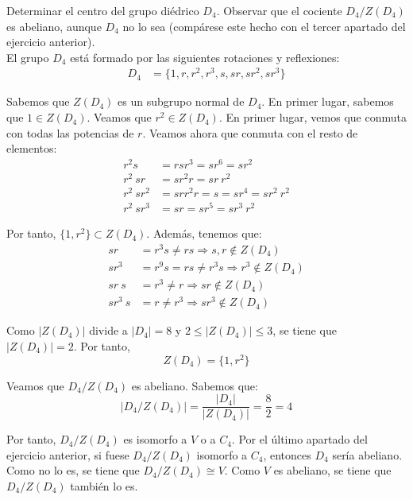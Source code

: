\begin{ejercicio}\label{ej:4.5}
    Determinar el centro del grupo diédrico $D_4$. Observar que el cociente $D_4/Z(D_4)$ es abeliano, aunque $D_4$ no lo sea (compárese este hecho con el tercer apartado del ejercicio anterior).\\

    El grupo $D_4$ está formado por las siguientes rotaciones y reflexiones:
    \begin{align*}
        D_4 &= \{1,r,r^2,r^3,s,sr,sr^2,sr^3\}
    \end{align*}

    Sabemos que $Z(D_4)$ es un subgrupo normal de $D_4$. En primer lugar, sabemos que $1\in Z(D_4)$. Veamos que $r^2\in Z(D_4)$. En primer lugar, vemos que conmuta con todas las potencias de $r$. Veamos ahora que conmuta con el resto de elementos:
    \begin{align*}
        r^2s &= rsr^3 = sr^6= sr^2\\
        r^2\ sr &= sr^2r = sr\ r^2\\
        r^2\ sr^2 &= srr^2r = s = sr^4 = sr^2\ r^2\\
        r^2\ sr^3 &= sr =sr^5 = sr^3\ r^2
    \end{align*}

    Por tanto, $\{1,r^2\}\subset Z(D_4)$. Además, tenemos que:
    \begin{align*}
        sr&=r^3s\neq rs \Longrightarrow s,r\notin Z(D_4)\\
        sr^3&=r^9s = rs\neq r^3s \Longrightarrow r^3\notin Z(D_4)\\
        sr\ s &= r^3\neq r\Longrightarrow sr \notin Z(D_4)\\
        sr^3\ s &= r \neq r^3 \Longrightarrow sr^3\notin Z(D_4)        
    \end{align*}

    Como $|Z(D_4)|$ divide a $|D_4|=8$ y $2\leq |Z(D_4)|\leq 3$, se tiene que $|Z(D_4)|=2$. Por tanto, $$Z(D_4)=\{1,r^2\}$$

    Veamos que $D_4/Z(D_4)$ es abeliano. Sabemos que:
    \begin{equation*}
        \left|D_4/Z(D_4)\right| = \dfrac{|D_4|}{|Z(D_4)|} = \dfrac{8}{2} = 4
    \end{equation*}

    Por tanto, $D_4/Z(D_4)$ es isomorfo a $V$ o a $C_4$. Por el último apartado del ejercicio anterior, si fuese $D_4/Z(D_4)$ isomorfo a $C_4$, entonces $D_4$ sería abeliano. Como no lo es, se tiene que $D_4/Z(D_4)\cong V$. Como $V$ es abeliano, se tiene que $D_4/Z(D_4)$ también lo es.
\end{ejercicio}


